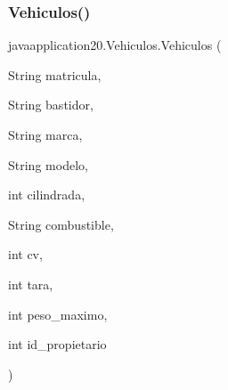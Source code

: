 \subsubsection{\texorpdfstring{Vehiculos()}{Vehiculos()}}
{\footnotesize\ttfamily javaapplication20.\+Vehiculos.\+Vehiculos (\begin{DoxyParamCaption}\item[{String}]{matricula,  }\item[{String}]{bastidor,  }\item[{String}]{marca,  }\item[{String}]{modelo,  }\item[{int}]{cilindrada,  }\item[{String}]{combustible,  }\item[{int}]{cv,  }\item[{int}]{tara,  }\item[{int}]{peso\+\_\+maximo,  }\item[{int}]{id\+\_\+propietario }\end{DoxyParamCaption})\hspace{0.3cm}{\ttfamily [inline]}}



